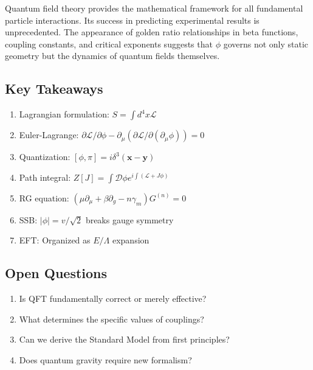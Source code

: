 Quantum field theory provides the mathematical framework for all fundamental particle interactions. Its success in predicting experimental results is unprecedented. The appearance of golden ratio relationships in beta functions, coupling constants, and critical exponents suggests that $\phi$ governs not only static geometry but the dynamics of quantum fields themselves.

\subsection*{Key Takeaways}

\begin{enumerate}
\item Lagrangian formulation: $S = \int d^4x \mathcal{L}$
\item Euler-Lagrange: $\partial\mathcal{L}/\partial\phi - \partial_\mu(\partial\mathcal{L}/\partial(\partial_\mu\phi)) = 0$
\item Quantization: $[\phi, \pi] = i\delta^3(\mathbf{x}-\mathbf{y})$
\item Path integral: $Z[J] = \int \mathcal{D}\phi e^{i\int(\mathcal{L} + J\phi)}$
\item RG equation: $(\mu\partial_\mu + \beta\partial_g - n\gamma_m)G^{(n)} = 0$
\item SSB: $|\phi| = v/\sqrt{2}$ breaks gauge symmetry
\item EFT: Organized as $E/\Lambda$ expansion
\end{enumerate}

\subsection*{Open Questions}

\begin{enumerate}
\item Is QFT fundamentally correct or merely effective?
\item What determines the specific values of couplings?
\item Can we derive the Standard Model from first principles?
\item Does quantum gravity require new formalism?
\end{enumerate}

